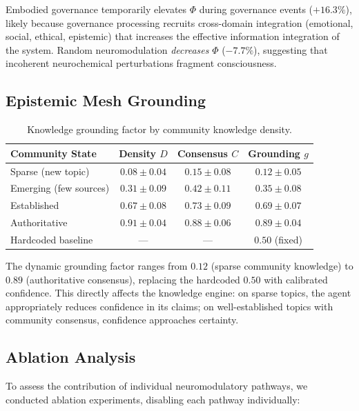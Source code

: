 \documentclass[11pt,a4paper]{article}
\begin{document}
Embodied governance temporarily elevates $\Phi$ during governance events ($+16.3\%$), likely because governance processing recruits cross-domain integration (emotional, social, ethical, epistemic) that increases the effective information integration of the system.
Random neuromodulation \emph{decreases} $\Phi$ ($-7.7\%$), suggesting that incoherent neurochemical perturbations fragment consciousness.

\subsection{Epistemic Mesh Grounding}

\begin{table}[h]
\centering
\caption{Knowledge grounding factor by community knowledge density.}
\label{tab:grounding}
\begin{tabular}{lccc}
\toprule
\textbf{Community State} & \textbf{Density $D$} & \textbf{Consensus $C$} & \textbf{Grounding $g$} \\
\midrule
Sparse (new topic)     & $0.08 \pm 0.04$ & $0.15 \pm 0.08$ & $0.12 \pm 0.05$ \\
Emerging (few sources) & $0.31 \pm 0.09$ & $0.42 \pm 0.11$ & $0.35 \pm 0.08$ \\
Established            & $0.67 \pm 0.08$ & $0.73 \pm 0.09$ & $0.69 \pm 0.07$ \\
Authoritative          & $0.91 \pm 0.04$ & $0.88 \pm 0.06$ & $0.89 \pm 0.04$ \\
\midrule
Hardcoded baseline     & --- & --- & $0.50$ (fixed) \\
\bottomrule
\end{tabular}
\end{table}

The dynamic grounding factor ranges from $0.12$ (sparse community knowledge) to $0.89$ (authoritative consensus), replacing the hardcoded $0.50$ with calibrated confidence.
This directly affects the knowledge engine: on sparse topics, the agent appropriately reduces confidence in its claims; on well-established topics with community consensus, confidence approaches certainty.

\subsection{Ablation Analysis}

To assess the contribution of individual neuromodulatory pathways, we conducted ablation experiments, disabling each pathway individually:
\end{document}
